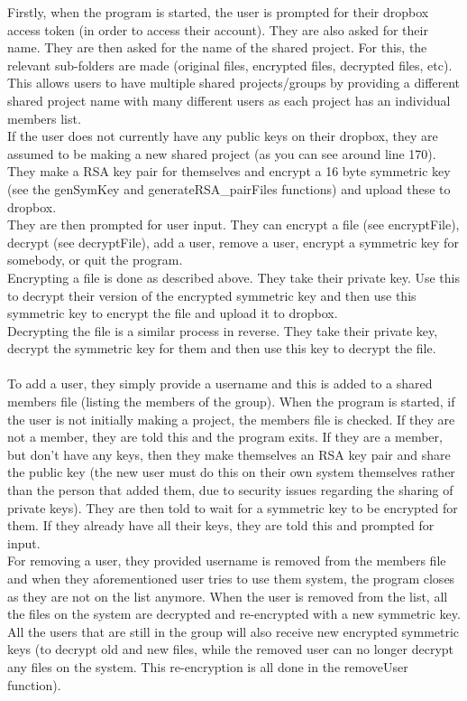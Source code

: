 \documentclass{report}
\begin{document}
    Firstly, when the program is started, the user is prompted for their dropbox access token (in order to access their account). They are also asked for their name. They are then asked for the name of the shared project. For this, the relevant sub-folders are made (original files, encrypted files, decrypted files, etc). This allows users to have multiple shared projects/groups by providing a different shared project name with many different users as each project has an individual members list.\\
    If the user does not currently have any public keys on their dropbox, they are assumed to be making a new shared project (as you can see around line 170). They make a RSA key pair for themselves and encrypt a 16 byte symmetric key (see the genSymKey and generateRSA\_pairFiles functions) and upload these to dropbox.\\
    They are then prompted for user input. They can encrypt a file (see encryptFile), decrypt (see decryptFile), add a user, remove a user, encrypt a symmetric key for somebody, or quit the program.\\
    Encrypting a file is done as described above. They take their private key. Use this to decrypt their version of the encrypted symmetric key and then use this symmetric key to encrypt the file and upload it to dropbox.\\
    Decrypting the file is a similar process in reverse. They take their private key, decrypt the symmetric key for them and then use this key to decrypt the file.\\\\
    To add a user, they simply provide a username and this is added to a shared members file (listing the members of the group). When the program is started, if the user is not initially making a project, the members file is checked. If they are not a member, they are told this and the program exits. If they are a member, but don't have any keys, then they make themselves an RSA key pair and share the public key (the new user must do this on their own system themselves rather than the person that added them, due to security issues regarding the sharing of private keys). They are then told to wait for a symmetric key to be encrypted for them. If they already have all their keys, they are told this and prompted for input.\\
    For removing a user, they provided username is removed from the members file and when they aforementioned user tries to use them system, the program closes as they are not on the list anymore. When the user is removed from the list, all the files on the system are decrypted and re-encrypted with a new symmetric key. All the users that are still in the group will also receive new encrypted symmetric keys (to decrypt old and new files, while the removed user can no longer decrypt any files on the system. This re-encryption is all done in the removeUser function).\\
\end{document}
